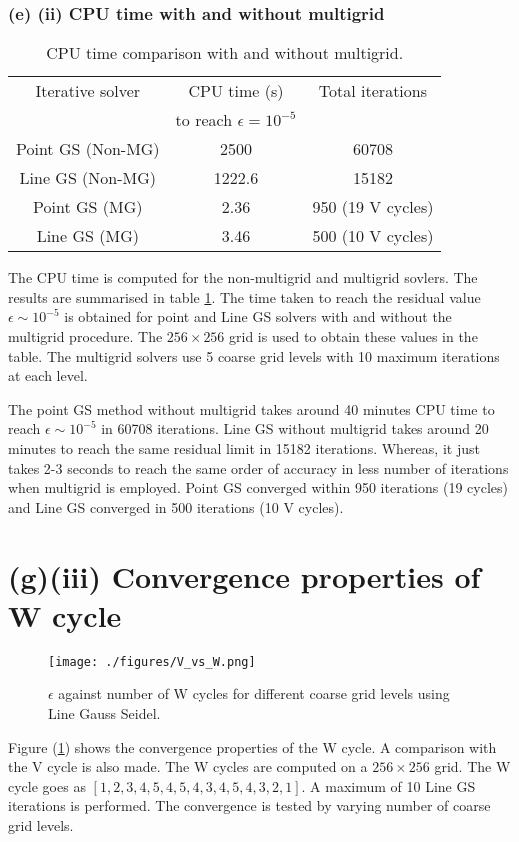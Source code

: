 \documentclass[11pt]{report}
\begin{document}
\subsubsection{(e) (ii) CPU time with and without multigrid}
\begin{table}[H]
	\centering
	\begin{tabular}{||c c c||} 
		\hline
		Iterative solver & CPU time (s) & Total iterations \\ [0.5ex] 
		& to reach $\epsilon=10^{-5}$  & \\
		\hline\hline
		Point GS (Non-MG) & 2500 &60708\\ 
		Line GS (Non-MG) & 1222.6 & 15182 \\
		Point GS (MG) & 2.36 & 950 (19 V cycles) \\
		Line GS (MG) & 3.46 & 500 (10 V cycles)\\
		\hline
	\end{tabular}
	\caption{CPU time comparison with and without multigrid.}
	\label{table:1}
\end{table}
The CPU time is computed for the non-multigrid and multigrid sovlers. The results are summarised in table 
\ref{table:1}. The time taken to reach the residual value $\epsilon\sim 10^{-5}$ is obtained for point and Line GS 
solvers with and without the multigrid procedure.  The $256\times256$ grid is used to obtain these values in the table. The multigrid solvers use 5 coarse grid levels with 10 maximum iterations at each level. 

The point GS method without multigrid takes around 40 minutes CPU time to reach $\epsilon \sim 10^{-5}$ in 60708 
iterations. Line GS without multigrid takes around 20 minutes to reach the same residual limit in 15182 iterations.
Whereas, it just takes 2-3 seconds to reach the same order of accuracy in less number of iterations when multigrid is employed. Point GS 
converged within 950 iterations (19 cycles) and Line GS converged in 500 iterations (10 V cycles). 
\section*{(g)(iii) Convergence properties of W cycle}
\begin{figure}[H]
	\begin{center}
		\texttt{[image: ./figures/V\_vs\_W.png]}
	\end{center}
	\caption{$\epsilon$ against number of W cycles for different coarse grid levels using Line Gauss Seidel.}\label{Wcyl}
\end{figure}
Figure (\ref{Wcyl}) shows the convergence properties of the W cycle. A comparison with the V cycle is also made.  The W cycles are computed on a $256\times256$ grid. The W cycle goes as $[1,2,3,4,5,4,5,4,3,4,5,4,3,2,1]$. A maximum of 10 Line GS iterations is performed. The convergence is tested by varying number of coarse grid levels.
\end{document}
